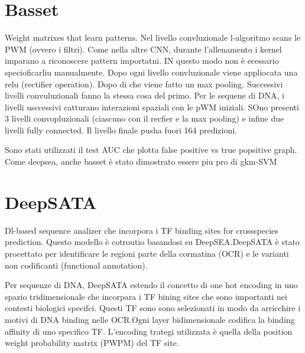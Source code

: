 \section{Basset}
Weight matrixes that learn patterns. Nel livello convluzionale l-algoritmo scans le PWM (ovvero i filtri). Come nella altre CNN, durante l'allenamento i kernel imparano a riconoscere pattern importatni. IN questo modo non è ecessario specioficarliu manualmente.
Dopo ogni livello convluzionale viene appliocata una relu (rectifier operation). Dopo di che viene fatto un max pooling. %
Successivi livelli convuluzionali fanno la stessa cosa del primo. Per le sequene di DNA, i livelli usccessivi catturano interazioni spaziali con le pWM iniziali. SOno presenti 3 livelli convopluzionali (ciascuno con il recfier e la max pooling) e infine due livelli fully connected. Il livello finale pusha fuori 164 predizioni.

Sono stati utilizzati il test AUC che plotta false positive vs true popsitive graph. Come deepsea, anche basset è stato dimostrato essere piu pro di gkm-SVM


\section{DeepSATA}


Dl-based sequence analizer che incorpora i TF binding sites for crossspecies prediction. Questo modello è cotroutio basandosi su DeepSEA.\@ DeepSATA è stato procettato per identificare le regioni parte della cormatina (OCR) e le varianti non codificanti (functional annotation).

Per sequenze di DNA, DeepSATA estendo il concetto di one hot encoding in uno spazio tridimensionale che incorpara i TF bining sites che sono importanti nei contesti biologici specifci. Questi TF sono sono selezionati in modo da arricchire i motivi di DNA binding nelle OCR.\@ Ogni layer bidimensionale codifica la binding affinity di uno specifico TF. L'encoding trategi utilizzata è quella della position weight probability matrix (PWPM) del TF site.

